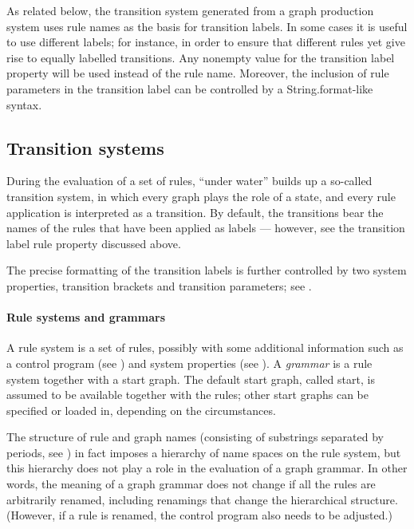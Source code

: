 As related below, the transition system generated from a graph production
system uses rule names as the basis for transition labels. In some cases it is
useful to use different labels; for instance, in order to ensure that different
rules yet give rise to equally labelled transitions. Any nonempty value for the
\textsf{transition label} property will be used instead of the rule
name. Moreover, the inclusion of rule parameters in the transition label can be
controlled by a \textsf{String.format}-like syntax.

\subsection{Transition systems}

During the evaluation of a set of rules, \GROOVE{} ``under water'' builds up a
so-called transition system, in which every graph plays the role of a state,
and every rule application is interpreted as a transition. By default, the
transitions bear the names of the rules that have been applied as
labels --- however, see the \textsf{transition label} rule property discussed
above.

The precise formatting of the transition labels is further controlled by two
system properties, \textsf{transition brackets} and
\textsf{transition parameters}; see .

\paragraph{Rule systems and grammars}

A rule system is a set of rules, possibly with some additional information such
as a control program (see ) and system properties (see
). A \emph{grammar} is a rule system together with a
start graph. The default start graph, called \textsf{start}, is assumed to be
available together with the rules; other start graphs can be specified or
loaded in, depending on the circumstances.

The structure of rule and graph names (consisting of substrings separated by
periods, see ) in fact imposes a hierarchy of name spaces on the
rule system, but this hierarchy does not play a role in the evaluation of a
graph grammar.  In other words, the meaning of a graph grammar does not change
if all the rules are arbitrarily renamed, including renamings that change the
hierarchical structure. (However, if a rule is renamed, the control program
also needs to be adjusted.)

